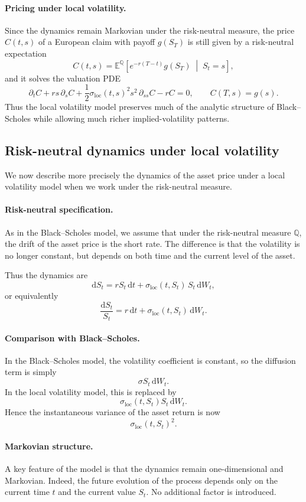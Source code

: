 \documentclass[11pt]{article}
\newcommand{\Qbb}{\mathbb{Q}}
\newcommand{\E}{\mathbb{E}}
\theoremstyle{plain}
\theoremstyle{definition}
\theoremstyle{remark}
\begin{document}
\paragraph{Pricing under local volatility.}
Since the dynamics remain Markovian under the risk-neutral measure, the
price \(C(t,s)\) of a European claim with payoff \(g(S_T)\) is still
given by a risk-neutral expectation
\[
C(t,s)
=
\E^\Qbb\!\left[
e^{-r(T-t)}g(S_T)
\;\middle|\;
S_t=s
\right],
\]
and it solves the valuation PDE
\[
\partial_t C
+
rs\,\partial_s C
+
\frac12 \sigma_{\mathrm{loc}}(t,s)^2 s^2\,\partial_{ss}C
-
rC
=
0,
\qquad
C(T,s)=g(s).
\]
Thus the local volatility model preserves much of the analytic structure
of Black--Scholes while allowing much richer implied-volatility
patterns. 

\subsection{Risk-neutral dynamics under local volatility}

We now describe more precisely the dynamics of the asset price under a
local volatility model when we work under the risk-neutral measure.

\paragraph{Risk-neutral specification.}
As in the Black--Scholes model, we assume that under the risk-neutral
measure \(\Qbb\), the drift of the asset price is the short rate.
The difference is that the volatility is no longer constant, but depends
on both time and the current level of the asset.

Thus the dynamics are
\[
\mathrm{d}S_t
=
rS_t\,\mathrm{d}t
+
\sigma_{\mathrm{loc}}(t,S_t)\,S_t\,\mathrm{d}W_t,
\]
or equivalently
\[
\frac{\mathrm{d}S_t}{S_t}
=
r\,\mathrm{d}t
+
\sigma_{\mathrm{loc}}(t,S_t)\,\mathrm{d}W_t.
\]

\paragraph{Comparison with Black--Scholes.}
In the Black--Scholes model, the volatility coefficient is constant, so
the diffusion term is simply
\[
\sigma S_t\,\mathrm{d}W_t.
\]
In the local volatility model, this is replaced by
\[
\sigma_{\mathrm{loc}}(t,S_t)S_t\,\mathrm{d}W_t.
\]
Hence the instantaneous variance of the asset return is now
\[
\sigma_{\mathrm{loc}}(t,S_t)^2.
\]

\paragraph{Markovian structure.}
A key feature of the model is that the dynamics remain one-dimensional
and Markovian.
Indeed, the future evolution of the process depends only on the current
time \(t\) and the current value \(S_t\).
No additional factor is introduced.
\end{document}
